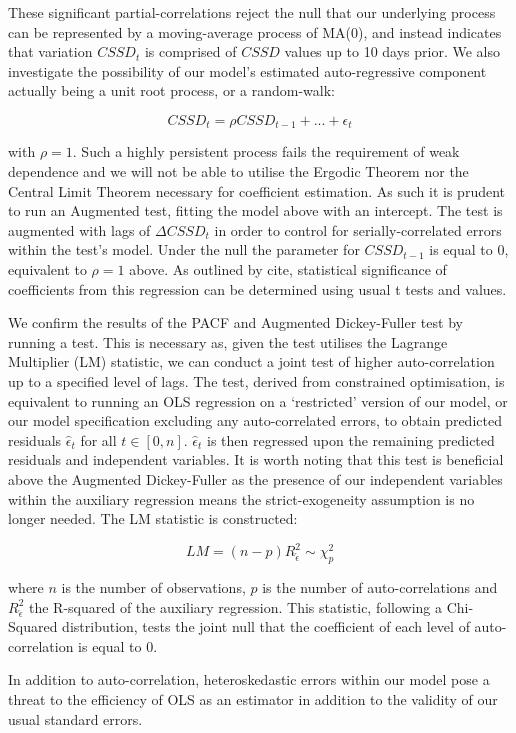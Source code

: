 \documentclass[12pt]{article}
\begin{document}
These significant partial-correlations reject the null that our underlying process can be represented by a moving-average process of MA(0), and instead indicates that variation $CSSD_t$ is comprised of $CSSD$ values up to 10 days prior. We also investigate the possibility of our model’s estimated auto-regressive component actually being a unit root process, or a random-walk:

$$
CSSD_t=\rho{CSSD_{t-1}}+...+\epsilon_t
$$

with $\rho=1$. Such a highly persistent process fails the requirement of weak dependence and we will not be able to utilise the Ergodic Theorem nor the Central Limit Theorem necessary for coefficient estimation. As such it is prudent to run an Augmented \citet{dfuller} test, fitting the model above with an intercept. The test is augmented with lags of $\Delta{CSSD_t}$ in order to control for serially-correlated errors within the test’s model. Under the null the parameter for $CSSD_{t-1}$ is equal to 0, equivalent to $\rho=1$ above. As outlined by cite, statistical significance of coefficients from this regression can be determined using usual t tests and values.

We confirm the results of the PACF and Augmented Dickey-Fuller test by running a \citet{breusch} \citet{godfrey} test. This is necessary as, given the test utilises the Lagrange Multiplier (LM) statistic, we can conduct a joint test of higher auto-correlation up to a specified level of lags. The test, derived from constrained optimisation, is equivalent to running an OLS regression on a ‘restricted’ version of our model, or our model specification excluding any auto-correlated errors, to obtain predicted residuals $\hat{\epsilon}_t$ for all $t\in[0,n]$. $\hat{\epsilon}_t$ is then regressed upon the remaining predicted residuals and independent variables. It is worth noting that this test is beneficial above the Augmented Dickey-Fuller as the presence of our independent variables within the auxiliary regression means the strict-exogeneity assumption is no longer needed. The LM statistic is constructed:

$$
LM=(n-p)R^2_{\hat{\epsilon}} \sim\chi^2_p
$$

where $n$ is the number of observations, $p$ is the number of auto-correlations and $R^2_{\hat{\epsilon}}$ the R-squared of the auxiliary regression. This statistic, following a Chi-Squared distribution, tests the joint null that the coefficient of each level of auto-correlation is equal to 0.

In addition to auto-correlation, heteroskedastic errors within our model pose a threat to the efficiency of OLS as an estimator in addition to the validity of our usual standard errors.
\end{document}
